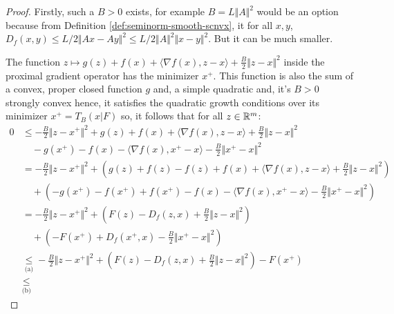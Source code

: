 \documentclass[12pt]{article}
\begin{document}
            \begin{proof}
                Firstly, such a $B > 0$ exists, for example $B = L\Vert A\Vert^2$ would be an option because from Definition \ref{def:seminorm-smooth-scnvx}, it for all $x, y$, $D_f(x, y) \le L/2\Vert Ax - Ay \Vert^2 \le L/2\Vert A\Vert^2\Vert x - y\Vert^2$. 
                But it can be much smaller. 
                \par
                The function $z \mapsto g(z) + f(x) + \langle \nabla f(x), z - x\rangle + \frac{B}{2}\Vert z - x\Vert^2$ inside the proximal gradient operator has the minimizer $x^+$.  
                This function is also the sum of a convex, proper closed function $g$ and, a simple quadratic and, it's $B > 0$ strongly convex hence, it satisfies the quadratic growth conditions over its minimizer $x^+ = T_B(x|F)$ so, it follows that for all $z \in \mathbb R^m$: 
                \begin{align*}
                    0 &\le 
                    -\frac{B}{2}\Vert z - x^+\Vert^2 
                    + g(z) + f(x) + \langle \nabla f(x), z - x\rangle + \frac{B}{2}\Vert z - x\Vert^2
                        \\&\quad 
                        - g(x^+) - f(x) - \langle \nabla f(x), x^+ - x\rangle - \frac{B}{2}\Vert x^+ - x\Vert^2
                    \\
                    &= 
                    -\frac{B}{2}\Vert z - x^+\Vert^2 
                    + \left(g(z) + f(z) - f(z) + f(x) + \langle \nabla f(x), z - x\rangle + \frac{B}{2}\Vert z - x\Vert^2\right)
                        \\&\quad 
                        +\left(- g(x^+) - f(x^+) + f(x^+) - f(x) - \langle \nabla f(x), x^+ - x\rangle - \frac{B}{2}\Vert x^+ - x\Vert^2\right)
                    \\
                    &=
                    -\frac{B}{2}\Vert z - x^+\Vert^2 
                    + \left(F(z) - D_f(z, x) + \frac{B}{2}\Vert z - x\Vert^2\right)
                        \\&\quad
                        + \left(- F(x^+) + D_f(x^+, x) - \frac{B}{2}\Vert x^+ - x\Vert^2\right)
                    \\
                    &\underset{\text{(a)}}{\le }
                    -\frac{B}{2}\Vert z - x^+\Vert^2 
                    + \left(F(z) - D_f(z, x) + \frac{B}{2}\Vert z - x\Vert^2\right)
                    - F(x^+)
                    \\
                    &\underset{\text{(b)}}{\le} 

\end{align*}
\end{proof}
\end{document}
